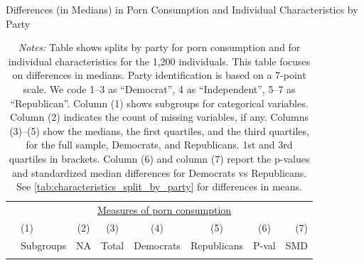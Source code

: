 \documentclass[12pt, letterpaper]{article}
\begin{document}
\begin{table}[ht] \centering \small \setlength\tabcolsep{5 pt}
	\caption{Differences (in Medians) in Porn Consumption and Individual Characteristics by Party}
	\label{tab:characteristics_split_by_party_medians}
	\begin{adjustbox}{max width=\textwidth}
		\begin{tabular}{@{\hspace{0\tabcolsep}}llrcccrr@{\hspace{0\tabcolsep}}}
			\toprule
			&\multicolumn{7}{c}{\underline{Measures of porn consumption}}\\
			&\multicolumn{1}{l}{(1)}&\multicolumn{1}{c}{(2)}&\multicolumn{1}{c}{(3)}&\multicolumn{1}{c}{(4)}&\multicolumn{1}{c}{(5)}&\multicolumn{1}{c}{(6)}&\multicolumn{1}{r}{(7)}\\			
			&\multicolumn{1}{l}{Subgroups}&\multicolumn{1}{c}{NA}&\multicolumn{1}{c}{Total}&\multicolumn{1}{c}{Democrats}&\multicolumn{1}{c}{Republicans}&\multicolumn{1}{c}{P-val}&\multicolumn{1}{r}{SMD}\\
			\cmidrule{2-8}
			\\
			\bottomrule
		\end{tabular}
	\end{adjustbox}
	\caption*{\scriptsize \emph{Notes:}
		Table shows splits by party for porn consumption and for individual characteristics for the 1,200 individuals.
		This table focuses on differences in medians.
		Party identification is based on a 7-point scale. We code 1--3 as ``Democrat'', 4 as ``Independent'', 5--7 as ``Republican''.
		Column (1) shows subgroups for categorical variables.
		Column (2) indicates the count of missing variables, if any.
		Columns (3)--(5) show the medians, the first quartiles, and the third quartiles, for the full sample, Democrats, and Republicans.
		1st and 3rd quartiles in brackets.
		Column (6) and column (7) report the p-values and standardized median differences for Democrats vs Republicans.
		See \cref{tab:characteristics_split_by_party} for differences in means.
	}
\end{table}
\end{document}
